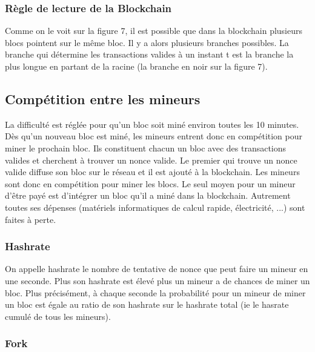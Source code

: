 \documentclass[11pt,a4paper]{article}
\begin{document}
\subsubsection{Règle de lecture de la Blockchain}

Comme on le voit sur la figure 7, il est possible que dans la blockchain plusieurs blocs pointent sur le même bloc. Il y a alors plusieurs branches possibles. La branche qui détermine les transactions valides à un instant t est la branche la plus longue en partant de la racine (la branche en noir sur la figure 7).

\subsection{Compétition entre les mineurs}

La difficulté est réglée pour qu'un bloc soit miné environ toutes les 10 minutes. Dès qu'un nouveau bloc est miné, les mineurs entrent donc en compétition pour miner le prochain bloc. Ils constituent chacun un bloc avec des transactions valides et cherchent à trouver un nonce valide. Le premier qui trouve un nonce valide diffuse son bloc sur le réseau et il est ajouté à la blockchain. Les mineurs sont donc en compétition pour miner les blocs. Le seul moyen pour un mineur d'être payé est d'intégrer un bloc qu'il a miné dans la blockchain. Autrement toutes ses dépenses (matériels informatiques de calcul rapide, électricité, ...) sont faites à perte.

\subsubsection{Hashrate}

On appelle hashrate le nombre de tentative de nonce que peut faire un mineur en une seconde. Plus son hashrate est élevé plus un mineur a de chances de miner un bloc. Plus précisément, à chaque seconde la probabilité pour un mineur de miner un bloc est égale au ratio de son hashrate sur le hashrate total (ie le hasrate cumulé de tous les mineurs).

\subsubsection{Fork}
\end{document}
